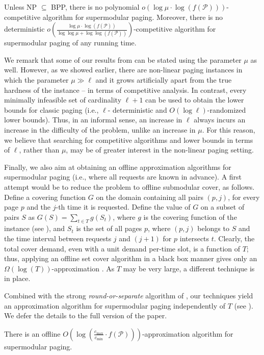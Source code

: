 \documentclass[11pt]{article}
\newcommand{\cP}{{\mathcal{P}}}
\begin{document}
\begin{cor}
	\label{thm:hardness}
	Unless \textnormal{NP $\subseteq $ BPP}, there is no polynomial $o\left(\log \mu \cdot \log \left(f(\cP)\right) \right)$-competitive algorithm for \textnormal{supermodular paging}. Moreover, there is no deterministic $o \left(\frac{\log \mu \cdot \log \left(f(\cP)\right)}{\log \log \mu+\log \log \left(f(\cP)\right)}\right)$-competitive algorithm for \textnormal{supermodular paging} of any running time. 
\end{cor}


We remark that some of our results from  can be stated using the parameter $\mu$ as well. However, as we showed earlier, there are non-linear paging instances in which the parameter $\mu \gg \ell$ and it grows artificially apart
from the true hardness of the instance – in terms of competitive analysis. In contrast, every minimally
infeasible set of cardinality $\ell+1$ can be used to obtain the lower bounds for classic paging \cite{sleator1985amortized,fiat1991competitive} (i.e., $\ell$-
deterministic and $O(\log \ell)$-randomized lower bounds). Thus, in an informal sense, an increase in $\ell$
always incurs an increase in the difficulty of the problem, unlike an increase in $\mu$. For this reason, we
believe that searching for competitive algorithms and lower bounds in terms of $\ell$, rather than $\mu$, may be of
greater interest in the non-linear paging setting.

Finally, we also aim at obtaining an offline approximation algorithms for supermodular paging (i.e., where all requests are known in advance). A first attempt would be to reduce the problem to offline submodular cover, as follows. Define a covering function $G$ on the domain containing all pairs $(p,j)$, for every page $p$ and the $j$-th time it is requested. Define the value of $G$ on a subset of pairs $S$ as $G(S) = \sum_{t \in T} g(S_t)$, where $g$ is the covering function of the instance (see ), and $S_t$ is the set of all pages $p$, where $(p,j)$ belongs to $S$ and the time interval between requests $j$ and $(j+1)$ for $p$ intersects $t$. Clearly,  the total cover demand, even with a unit demand per-time slot, is a function of $T$; thus, applying an offline set cover algorithm in a black box manner gives only an $\Omega\left(\log \left(T\right)\right)$-approximation \cite{lund1994hardness}. As $T$ may be very large, a different technique is in place.

Combined with the strong {\em round-or-separate} algorithm of \cite{gupta2020online}, our techniques yield an approximation algorithm for supermodular paging independently of $T$ (see ).
We defer the details to the full version of the paper.
\begin{theorem}
	\label{thm:approximation}
	There is an offline $O\left( \log \left(\frac{c_{\max}}{c_{\min}} \cdot f(\cP) \right)\right)$-approximation algorithm for \textnormal{supermodular paging}. %
	\end{theorem}
\end{document}
